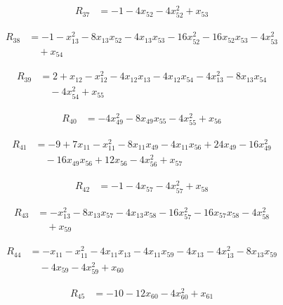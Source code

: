 \begin{align*}
R_{37} &= -1 -4 x_{52} -4 x_{52}^{2} +x_{53}
\end{align*}

\begin{align*}
R_{38} &= -1 -x_{13}^{2} -8 x_{13} x_{52} -4 x_{13} x_{53} -16 x_{52}^{2} -16 x_{52} x_{53} -4 x_{53}^{2} \\
&\quad +x_{54}
\end{align*}

\begin{align*}
R_{39} &= 2 +x_{12} -x_{12}^{2} -4 x_{12} x_{13} -4 x_{12} x_{54} -4 x_{13}^{2} -8 x_{13} x_{54} \\
&\quad -4 x_{54}^{2} +x_{55}
\end{align*}

\begin{align*}
R_{40} &= -4 x_{49}^{2} -8 x_{49} x_{55} -4 x_{55}^{2} +x_{56}
\end{align*}

\begin{align*}
R_{41} &= -9 +7 x_{11} -x_{11}^{2} -8 x_{11} x_{49} -4 x_{11} x_{56} +24 x_{49} -16 x_{49}^{2} \\
&\quad -16 x_{49} x_{56} +12 x_{56} -4 x_{56}^{2} +x_{57}
\end{align*}

\begin{align*}
R_{42} &= -1 -4 x_{57} -4 x_{57}^{2} +x_{58}
\end{align*}

\begin{align*}
R_{43} &= -x_{13}^{2} -8 x_{13} x_{57} -4 x_{13} x_{58} -16 x_{57}^{2} -16 x_{57} x_{58} -4 x_{58}^{2} \\
&\quad +x_{59}
\end{align*}

\begin{align*}
R_{44} &= -x_{11} -x_{11}^{2} -4 x_{11} x_{13} -4 x_{11} x_{59} -4 x_{13} -4 x_{13}^{2} -8 x_{13} x_{59} \\
&\quad -4 x_{59} -4 x_{59}^{2} +x_{60}
\end{align*}

\begin{align*}
R_{45} &= -10 -12 x_{60} -4 x_{60}^{2} +x_{61}
\end{align*}


